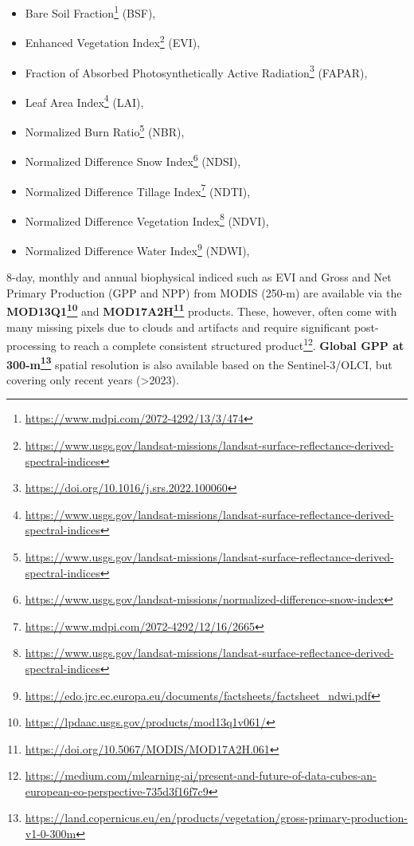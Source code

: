 \documentclass[
  graybox,natbib,nospthms]{svmono}
\providecommand{\tightlist}{%
  \setlength{\itemsep}{0pt}\setlength{\parskip}{0pt}}
\providecommand{\tightlist}{\setlength{\itemsep}{0pt}\setlength{\parskip}{0pt}}
\renewcommand{\href}[2]{#2 (\url{#1})}
\renewcommand{\href}[2]{#2\footnote{\url{#1}}}
\begin{document}
\begin{itemize}
\tightlist
\item
  \href{https://www.mdpi.com/2072-4292/13/3/474}{Bare Soil Fraction} (BSF),
\item
  \href{https://www.usgs.gov/landsat-missions/landsat-surface-reflectance-derived-spectral-indices}{Enhanced Vegetation Index} (EVI),
\item
  \href{https://doi.org/10.1016/j.srs.2022.100060}{Fraction of Absorbed Photosynthetically Active Radiation} (FAPAR),
\item
  \href{https://www.usgs.gov/landsat-missions/landsat-surface-reflectance-derived-spectral-indices}{Leaf Area Index} (LAI),
\item
  \href{https://www.usgs.gov/landsat-missions/landsat-surface-reflectance-derived-spectral-indices}{Normalized Burn Ratio} (NBR),
\item
  \href{https://www.usgs.gov/landsat-missions/normalized-difference-snow-index}{Normalized Difference Snow Index} (NDSI),
\item
  \href{https://www.mdpi.com/2072-4292/12/16/2665}{Normalized Difference Tillage Index} (NDTI),
\item
  \href{https://www.usgs.gov/landsat-missions/landsat-surface-reflectance-derived-spectral-indices}{Normalized Difference Vegetation Index} (NDVI),
\item
  \href{https://edo.jrc.ec.europa.eu/documents/factsheets/factsheet_ndwi.pdf}{Normalized Difference Water Index} (NDWI),
\end{itemize}

8-day, monthly and annual biophysical indiced such as EVI and Gross and Net Primary Production (GPP and NPP) from MODIS (250-m) are available via the \textbf{\href{https://lpdaac.usgs.gov/products/mod13q1v061/}{MOD13Q1}} and \textbf{\href{https://doi.org/10.5067/MODIS/MOD17A2H.061}{MOD17A2H}} products.
These, however, often come with many missing pixels due to clouds and artifacts
and require significant post-processing to reach a \href{https://medium.com/mlearning-ai/present-and-future-of-data-cubes-an-european-eo-perspective-735d3f16f7c9}{complete consistent structured product}.
\textbf{\href{https://land.copernicus.eu/en/products/vegetation/gross-primary-production-v1-0-300m}{Global GPP at 300-m}} spatial resolution is also available based on the Sentinel-3/OLCI, but covering only recent years (\textgreater2023).
\end{document}
